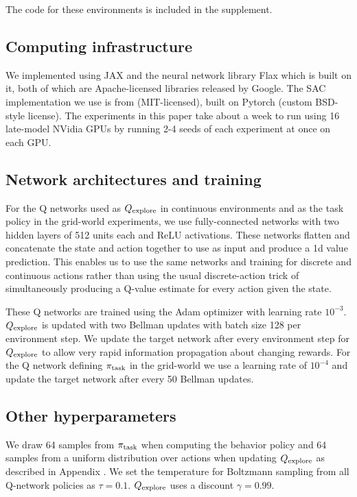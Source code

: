 The code for these environments is included in the supplement.



 \label{sec:appendix_benchmark_implementation}

\subsection{Computing infrastructure}
We implemented \algshort{} using JAX \citep{jax2018github} and the neural network library Flax \citep{flax2020github} which is built on it, both of which are Apache-licensed libraries released by Google.
The SAC implementation we use is from \citet{pytorch_sac} (MIT-licensed), built on Pytorch \citep{Paszke2019PyTorchAI} (custom BSD-style license).
The experiments in this paper take about a week to run using 16 late-model NVidia GPUs by running 2-4 seeds of each experiment at once on each GPU.

\subsection{Network architectures and training}
For the Q networks used as $Q_{\text{explore}}$ in continuous environments and as the task policy in the grid-world experiments, we use fully-connected networks with two hidden layers of 512 units each and ReLU activations.
These networks flatten and concatenate the state and action together to use as input and produce a 1d value prediction.
This enables us to use the same networks and training for discrete and continuous actions rather than using the usual discrete-action trick of simultaneously producing a Q-value estimate for every action given the state.

These Q networks are trained using the Adam optimizer \citep{kingma2014adam} with learning rate $10^{-3}$.
$Q_{\text{explore}}$ is updated with two Bellman updates with batch size 128 per environment step.
We update the target network after every environment step for $Q_{\text{explore}}$ to allow very rapid information propagation about changing rewards.
For the Q network defining $\pi_{\text{task}}$ in the grid-world we use a learning rate of $10^{-4}$ and update the target network after every 50 Bellman updates.

\subsection{Other hyperparameters}
We draw 64 samples from $\pi_{\text{task}}$ when computing the behavior policy and 64 samples from a uniform distribution over actions when updating $Q_{\text{explore}}$ as described in Appendix .
We set the temperature for Boltzmann sampling from all Q-network policies as $\tau = 0.1$.
$Q_{\text{explore}}$ uses a discount $\gamma = 0.99$.


